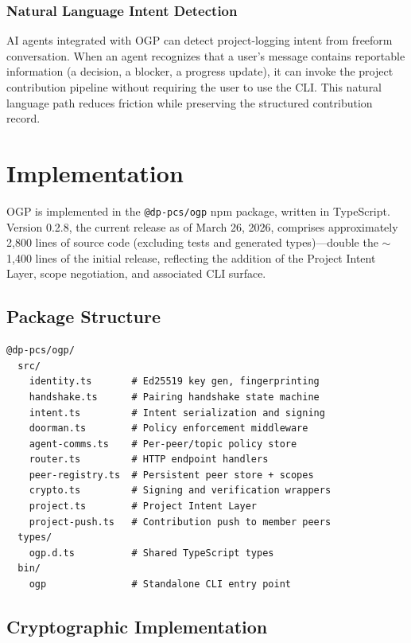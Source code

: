 \documentclass[conference]{IEEEtran}
\begin{document}
\subsubsection{Natural Language Intent Detection}

AI agents integrated with OGP can detect project-logging intent from freeform conversation. When an agent recognizes that a user's message contains reportable information (a decision, a blocker, a progress update), it can invoke the project contribution pipeline without requiring the user to use the CLI. This natural language path reduces friction while preserving the structured contribution record.

\section{Implementation}
\label{sec:implementation}

OGP is implemented in the \texttt{@dp-pcs/ogp} npm package, written in TypeScript. Version 0.2.8, the current release as of March 26, 2026, comprises approximately 2,800 lines of source code (excluding tests and generated types)---double the $\sim$1,400 lines of the initial release, reflecting the addition of the Project Intent Layer, scope negotiation, and associated CLI surface.

\subsection{Package Structure}

\begin{lstlisting}
@dp-pcs/ogp/
  src/
    identity.ts       # Ed25519 key gen, fingerprinting
    handshake.ts      # Pairing handshake state machine
    intent.ts         # Intent serialization and signing
    doorman.ts        # Policy enforcement middleware
    agent-comms.ts    # Per-peer/topic policy store
    router.ts         # HTTP endpoint handlers
    peer-registry.ts  # Persistent peer store + scopes
    crypto.ts         # Signing and verification wrappers
    project.ts        # Project Intent Layer
    project-push.ts   # Contribution push to member peers
  types/
    ogp.d.ts          # Shared TypeScript types
  bin/
    ogp               # Standalone CLI entry point
\end{lstlisting}

\subsection{Cryptographic Implementation}
\end{document}
